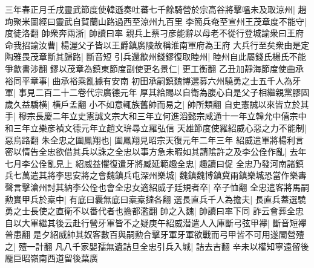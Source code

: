 三年春正月壬戌靈武節度使韓遜奏吐蕃七千餘騎營於宗高谷將擊嗢未及取涼州|{
	趙珣聚米圖經曰靈武自賀蘭山路過西至涼州九百里}
李簡兵奄至宣州王茂章度不能守|{
	度徒洛翻}
帥衆奔兩浙|{
	帥讀曰率}
親兵上蔡刁彦能辭以母老不從行登城諭衆曰王府命我招諭汝曹|{
	楊渥父子皆以王爵鎮廣陵故稱淮南軍府為王府}
大兵行至矣衆由是定陶雅畏茂章斷其歸路|{
	斷音短}
引兵還歙州錢鏐復取睦州|{
	睦州自此屬錢氏楊氏不能爭歙書涉翻}
鏐以茂章為鎮東節度副使更名景仁|{
	更工衡翻}
乙丑加靜海節度使曲承裕同平章事|{
	曲承裕乘亂據有安南}
初田承嗣鎮魏博選募六州驍勇之士五千人為牙軍|{
	事見二百二十二卷代宗廣德元年}
厚其給賜以自衛為腹心自是父子相繼親黨膠固歲久益驕横|{
	横戶孟翻}
小不如意輒族舊帥而易之|{
	帥所類翻}
自史憲誠以來皆立於其手|{
	穆宗長慶二年立史憲誠文宗大和三年立何進滔懿宗咸通十一年立韓允中僖宗中和三年立樂彦禎文德元年立趙文㺹尋立羅弘信}
天雄節度使羅紹威心惡之力不能制|{
	惡烏路翻}
朱全忠之圍鳳翔也|{
	圍鳳翔見昭宗天復元年二年三年}
紹威遣軍將楊利言密以情告全忠欲借其兵以誅之全忠以事方急未暇如其請隂許之及李公佺作亂|{
	去年七月李公佺亂見上}
紹威益懼復遣牙將臧延範趣全忠|{
	趣讀曰促}
全忠乃發河南諸鎮兵七萬遣其將李思安將之會魏鎮兵屯深州樂城|{
	魏鎮魏博鎮冀兩鎮樂城恐當作樂夀}
聲言擊滄州討其納李公佺也會全忠女適紹威子廷規者卒|{
	卒子恤翻}
全忠遣客將馬嗣勲實甲兵於槖中|{
	有底曰囊無底曰槖槖撻各翻}
選長直兵千人為擔夫|{
	長直兵蓋選驍勇之士長使之直衛不以番代者也擔都濫翻}
帥之入魏|{
	帥讀曰率下同}
詐云會葬全忠自以大軍繼其後云赴行營牙軍皆不之疑庚午紹威潜遣人入庫斷弓弦甲襻|{
	斷音短襻普患翻}
是夕紹威帥其奴客數百與嗣勲合擊牙軍牙軍欲戰而弓甲皆不可用遂闔營殪之|{
	殪一計翻}
凡八千家嬰孺無遺詰旦全忠引兵入城|{
	詰去吉翻}
辛未以權知寧遠留後龎巨昭嶺南西道留後葉廣

